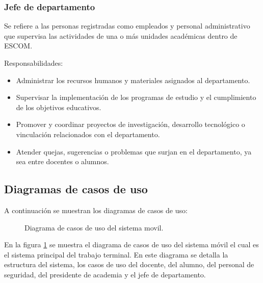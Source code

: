 \begin{Usuario}{\hypertarget{tJefe}{\subsubsection{Jefe de departamento}}}{
	Se refiere a las personas registradas como empleados y personal administrativo que supervisa las actividades de una o más unidades académicas dentro de ESCOM.
}
\item[Responsabilidades:] \cdtEmpty
\begin{itemize}

	\item Administrar los recursos humanos y materiales asignados al departamento.
	\item Supervisar la implementación de los programas de estudio y el cumplimiento de los objetivos educativos.
	\item Promover y coordinar proyectos de investigación, desarrollo tecnológico o vinculación relacionados con el departamento.
	\item Atender quejas, sugerencias o problemas que surjan en el departamento, ya sea entre docentes o alumnos.
\end{itemize}

\end{Usuario}

\newpage

\subsection{Diagramas de casos de uso}

A continuación se muestran los diagramas de casos de uso:


\begin{figure}[htbp!]
	\begin{center}
		\caption{Diagrama de casos de uso del sistema movil.}
		\label{fig:casosDeUso1}
	\end{center}
\end{figure}
En la figura \ref{fig:casosDeUso1} se muestra el diagrama de casos de uso del sistema móvil el cual es el sistema principal del trabajo terminal. En este diagrama se detalla la estructura del sistema, los casos de uso del docente, del alumno, del personal de seguridad, del presidente de academia y el jefe de departamento.

